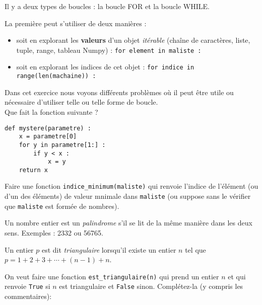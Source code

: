 


\begin{enonce}

	Il y a deux types de boucles : la boucle FOR et la boucle WHILE.

	La première peut s'utiliser de deux manières :
	\begin{itemize}
		\item soit en explorant les {\bf valeurs} d'un objet {\em itérable} (chaîne de caractères, liste, tuple, range, tableau Numpy) : \texttt{for element in maliste :}
		\item soit en explorant les indices de cet objet : \texttt{for indice in range(len(machaine)) :}
	\end{itemize}

	Dans cet exercice nous voyons différents problèmes où il peut être utile ou nécessaire d'utiliser telle ou telle forme de boucle.\\

	\quessques Que fait la fonction suivante ?

	\begin{verbatim}
def mystere(parametre) :
    x = parametre[0]
    for y in parametre[1:] :
        if y < x :
            x = y
    return x
\end{verbatim}

	\ssques Faire une fonction \texttt{indice\_minimum(maliste)} qui renvoie l'indice de l'élément (ou d'un des éléments) de valeur mnimale dans \texttt{maliste}  (ou suppose sans le vérifier que \texttt{maliste} est formée de nombres).

	\ques Un nombre entier est un {\em palindrome} s'il se lit de la même manière dans les deux sens. Exemples : 2332 ou 56765.

	Un entier $p$ est dit   {\em triangulaire} lorsqu'il existe un entier $n$ tel que $p=1+2+3+\cdots+(n-1)+n$.

	\ssques On veut faire  une fonction \texttt{est\_triangulaire(n)} qui prend un entier $n$ et qui renvoie \texttt{True} si $n$ est triangulaire et \texttt{False} sinon. Complétez-la (y compris les commentaires):


\end{enonce}

